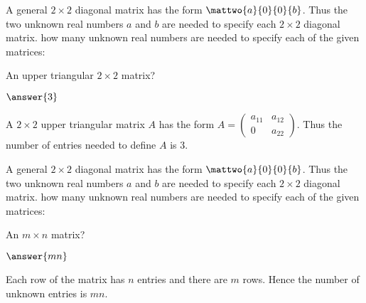 \documentclass{article}
\begin{document}
\problemlabel

\noindent A general $2\times 2$ diagonal matrix has the form $\mattwo{a}{0}{0}{b}$.  Thus the two unknown real numbers $a$ and $b$ are needed to specify each $2\times 2$ diagonal matrix.  how many unknown real numbers are needed to specify each of the given matrices:

\begin{exercise}  \label{c1.3.1a}
An upper triangular $2\times 2$ matrix? \begin{prompt}$\answer{3}$\end{prompt}

\begin{solution}
A $2\times 2$ upper triangular matrix $A$ has the form $A = \left( \begin{array}{cc}
            a_{11} & a_{12} \\
            0 & a_{22} \end{array} \right)$.  Thus the number of entries needed to define $A$ is $3$.  

\end{solution}
\end{exercise}





\problemlabel

\noindent A general $2\times 2$ diagonal matrix has the form $\mattwo{a}{0}{0}{b}$.  Thus the two unknown real numbers $a$ and $b$ are needed to specify each $2\times 2$ diagonal matrix.  how many unknown real numbers are needed to specify each of the given matrices:

\begin{exercise}  \label{c1.3.2}
An $m\times n$ matrix? \begin{prompt}$\answer{mn}$\end{prompt}

\begin{solution}
Each row of the matrix has $n$ entries and there are $m$ rows.  Hence the number of unknown entries is $mn$.

\end{solution}
\end{exercise}





\problemlabel
\end{document}
